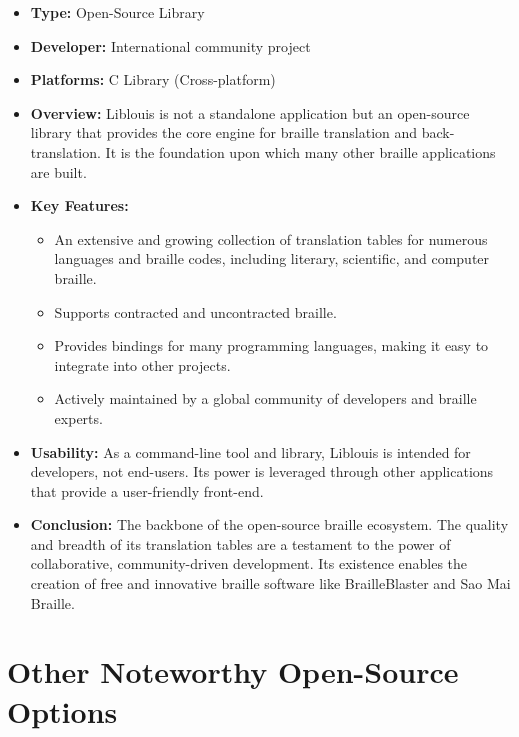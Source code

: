 \begin{itemize}
	\item \textbf{Type:} Open-Source Library
	\item \textbf{Developer:} International community project
	\item \textbf{Platforms:} C Library (Cross-platform)
	\item \textbf{Overview:} Liblouis \supercite{Liblouis} is not a standalone application but an open-source library that provides the core engine for braille translation and back-translation. It is the foundation upon which many other braille applications are built.
	\item \textbf{Key Features:}
	      \begin{itemize}
		      \item An extensive and growing collection of translation tables for numerous languages and braille codes, including literary, scientific, and computer braille.
		      \item Supports contracted and uncontracted braille.
		      \item Provides bindings for many programming languages, making it easy to integrate into other projects.
		      \item Actively maintained by a global community of developers and braille experts.
	      \end{itemize}
	\item \textbf{Usability:} As a command-line tool and library, Liblouis is intended for developers, not end-users. Its power is leveraged through other applications that provide a user-friendly front-end.
	\item \textbf{Conclusion:} The backbone of the open-source braille ecosystem. The quality and breadth of its translation tables are a testament to the power of collaborative, community-driven development. Its existence enables the creation of free and innovative braille software like BrailleBlaster and Sao Mai Braille.
\end{itemize}

\section{Other Noteworthy Open-Source Options}
\label{sec:other-noteworthy-open-source-options}

